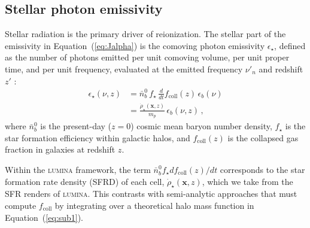 \documentclass[apj,twocolumn, appendixfloats, twocolappendix, numberedappendix, tighten]{openjournal}
\DeclareRobustCommand{\lumina}{\mbox{\textsc{lumina}}\xspace}
\begin{document}
\begin{appendix}
\subsection{Stellar photon emissivity} \label{sec:stars}
Stellar radiation is the primary driver of  reionization. The stellar part of the emissivity in Equation~(\ref{eq:Jalpha}) is the comoving photon emissivity $\epsilon_\star$, defined as the number of photons emitted per unit comoving volume, per unit proper time, and per unit frequency, evaluated at the emitted frequency $\nu'_n$ and redshift $z'$ \citep[][]{Barkana2001}:
\begin{subequations}
\begin{align}
    \epsilon_\star(\nu,z) & =
    \bar{n}^0_b \,f_\star \,
    \frac{d}{dt}f_\mathrm{coll}(z) \,\epsilon_b(\nu) \label{eq:sub1} \\
    & = \frac{\dot{\rho}_\star(\mathbf{x}, z)}{m_p}\, \epsilon_b(\nu, z)\,, \label{eq:sub2}
\end{align}
\end{subequations}
where $\bar{n}^0_b$ is the present-day ($z=0$) cosmic mean baryon number density, $f_\star$ is the star formation efficiency within galactic halos, and $f_\mathrm{coll}(z)$ is the collapsed gas fraction in galaxies at redshift $z$.

Within the \lumina framework, the term $\bar{n}^0_b f_\star df_\mathrm{coll}(z)/dt$ corresponds to the star formation rate density (SFRD) of each cell, $\dot{\rho}_\star(\mathbf{x}, z)$, which we take from the SFR renders of \lumina. This contrasts with semi-analytic approaches that must compute $f_\mathrm{coll}$ by integrating over a theoretical halo mass function \citep[e.g.][]{Barkana2005, Kaurov2016, Mesinger2011} in Equation~(\ref{eq:sub1}).


\end{appendix}
\end{document}

